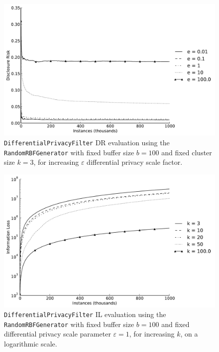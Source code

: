 \begin{figure}[h]
	\centering
	\includegraphics[width=0.9\linewidth]{figures/dr_dp-k3-random.pdf}
	\caption[Differential privacy DR evaluation ($b = 100,~k = 3$).]{\texttt{DifferentialPrivacyFilter} DR evaluation using the \texttt{RandomRBFGenerator} with fixed buffer size $b = 100$ and fixed cluster size $k = 3$, for increasing $\varepsilon$ differential privacy scale factor.}
	\label{fig:results-dr-dp-k3}
\end{figure}

\begin{figure}[h]
	\centering
	\includegraphics[width=0.9\linewidth]{figures/il-log_dp-e1-random.pdf}
	\caption[Differential privacy IL evaluation ($b = 100,~\varepsilon = 1$).]{\texttt{DifferentialPrivacyFilter} IL evaluation using the \texttt{RandomRBFGenerator} with fixed buffer size $b = 100$ and fixed differential privacy scale parameter $\varepsilon = 1$, for increasing $k$, on a logarithmic scale.}
	\label{fig:results-il-dp-e1}
\end{figure}


